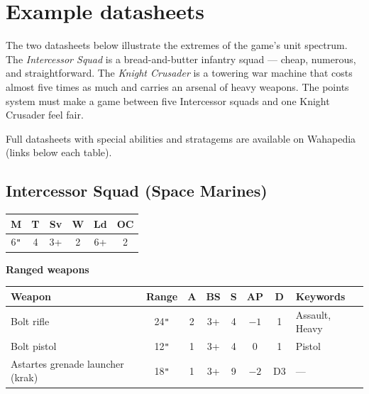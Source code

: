 \documentclass[11pt,a4paper]{article}
\begin{document}
\newpage

\section{Example datasheets}
\label{sec:datasheets}

The two datasheets below illustrate the extremes of the game's unit
spectrum. The \textit{Intercessor Squad} is a bread-and-butter infantry
squad --- cheap, numerous, and straightforward. The \textit{Knight Crusader}
is a towering war machine that costs almost five times as much and carries
an arsenal of heavy weapons. The points system must make a game between
five Intercessor squads and one Knight Crusader feel fair.

Full datasheets with special abilities and stratagems are available on
Wahapedia (links below each table).

\vspace{4mm}

\subsection{Intercessor Squad \normalfont\small(Space Marines)}

\begin{center}
\renewcommand{\arraystretch}{1.2}
\begin{tabular}{cccccc}
  \toprule
  \textbf{M} & \textbf{T} & \textbf{Sv} & \textbf{W} & \textbf{Ld} & \textbf{OC} \\
  \midrule
  6\texttt{"} & 4 & 3+ & 2 & 6+ & 2 \\
  \bottomrule
\end{tabular}
\end{center}

\vspace{2mm}

\textbf{Ranged weapons}

\begin{center}
\renewcommand{\arraystretch}{1.2}
\begin{tabular}{l c c c c c c l}
  \toprule
  \textbf{Weapon} & \textbf{Range} & \textbf{A} & \textbf{BS} & \textbf{S} & \textbf{AP} & \textbf{D} & \textbf{Keywords} \\
  \midrule
  Bolt rifle & 24\texttt{"} & 2 & 3+ & 4 & $-1$ & 1 & Assault, Heavy \\
  Bolt pistol & 12\texttt{"} & 1 & 3+ & 4 & 0 & 1 & Pistol \\
  Astartes grenade launcher (krak) & 18\texttt{"} & 1 & 3+ & 9 & $-2$ & D3 & --- \\
  \bottomrule
\end{tabular}
\end{center}
\end{document}
